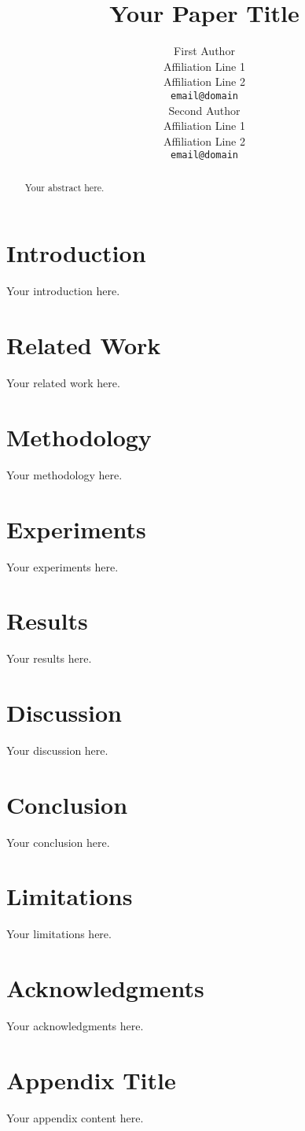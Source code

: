 \documentclass[11pt]{article}
\title{Your Paper Title}
\author{
  First Author \\
  Affiliation Line 1 \\
  Affiliation Line 2 \\
  \texttt{email@domain} \\\And
  Second Author \\
  Affiliation Line 1 \\
  Affiliation Line 2 \\
  \texttt{email@domain} \\
}
\begin{document}
\maketitle

\begin{abstract}
Your abstract here.
\end{abstract}

\section{Introduction}
Your introduction here.

\section{Related Work}
Your related work here.

\section{Methodology}
Your methodology here.

\section{Experiments}
Your experiments here.

\section{Results}
Your results here.

\section{Discussion}
Your discussion here.

\section{Conclusion}
Your conclusion here.

\section*{Limitations}
Your limitations here.

\section*{Acknowledgments}
Your acknowledgments here.




\appendix

\section{Appendix Title}
\label{sec:appendix}
Your appendix content here.
\end{document}
